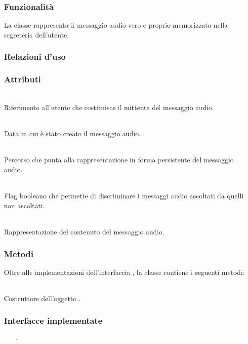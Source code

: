 \subsubsection*{Funzionalità}
La classe rappresenta il messaggio audio vero e proprio memorizzato nella segreteria dell'utente.

\subsubsection*{Relazioni d'uso}

\subsubsection*{Attributi}
\begin{description}
  \item{}\\
Riferimento all'utente che costituisce il mittente del messaggio audio.
  \item{}\\
Data in cui è stato creato il messaggio audio.
  \item{}\\
Percorso che punta alla rappresentazione in forma persistente del messaggio audio.
  \item{}\\
Flag booleano che permette di discriminare i messaggi audio ascoltati da quelli non ascoltati.
  \item{}\\
Rappresentazione del contenuto del messaggio audio.
\end{description}

\subsubsection*{Metodi}
Oltre alle implementazioni dell'interfaccia , la classe contiene i seguenti metodi:
\begin{description}
  \item{}\\
Costruttore dell'oggetto .
\end{description}


\subsubsection*{Interfacce implementate}
\begin{itemize}[noitemsep,nolistsep]
  \item[-] 
\end{itemize}

